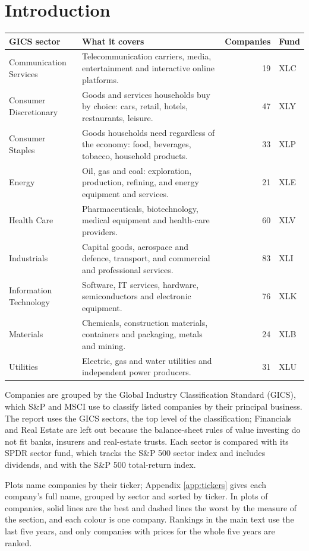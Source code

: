 \documentclass[11pt,a4paper]{article}
\begin{document}
\section{Introduction}
\label{sec:introduction}
\begin{table}[H]
\centering
\small
\begin{tabular}{p{3.4cm}p{8.6cm}rl}
\hline
GICS sector & What it covers & Companies & Fund \\
\hline
Communication Services & Telecommunication carriers, media, entertainment and interactive online platforms. & 19 & XLC \\
Consumer Discretionary & Goods and services households buy by choice: cars, retail, hotels, restaurants, leisure. & 47 & XLY \\
Consumer Staples & Goods households need regardless of the economy: food, beverages, tobacco, household products. & 33 & XLP \\
Energy & Oil, gas and coal: exploration, production, refining, and energy equipment and services. & 21 & XLE \\
Health Care & Pharmaceuticals, biotechnology, medical equipment and health-care providers. & 60 & XLV \\
Industrials & Capital goods, aerospace and defence, transport, and commercial and professional services. & 83 & XLI \\
Information Technology & Software, IT services, hardware, semiconductors and electronic equipment. & 76 & XLK \\
Materials & Chemicals, construction materials, containers and packaging, metals and mining. & 24 & XLB \\
Utilities & Electric, gas and water utilities and independent power producers. & 31 & XLU \\
\hline
\end{tabular}
\end{table}
Companies are grouped by the Global Industry Classification Standard (GICS), which S\&P and MSCI use to classify listed companies by their principal business. The report uses the GICS sectors, the top level of the classification; Financials and Real Estate are left out because the balance-sheet rules of value investing do not fit banks, insurers and real-estate trusts. Each sector is compared with its SPDR sector fund, which tracks the S\&P 500 sector index and includes dividends, and with the S\&P 500 total-return index.

Plots name companies by their ticker; Appendix \ref{app:tickers} gives each company's full name, grouped by sector and sorted by ticker. In plots of companies, solid lines are the best and dashed lines the worst by the measure of the section, and each colour is one company. Rankings in the main text use the last five years, and only companies with prices for the whole five years are ranked.
\end{document}
